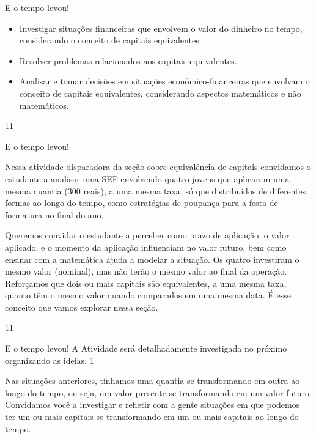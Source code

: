 \def\currentcolor{session1}
\begin{objectives}{E o tempo levou!}
{
\begin{itemize}
\item Investigar situações financeiras que envolvem o valor do dinheiro no tempo, considerando o conceito de capitais equivalentes 
\item Resolver problemas relacionados aos capitais equivalentes.
\item Analisar e tomar decisões em situações econômico-financeiras que envolvam o conceito de capitais equivalentes, considerando aspectos matemáticos e não matemáticos.
\end{itemize}
}{1}{1}
\end{objectives}
\begin{sugestions}{E o tempo levou!}
{
Nessa atividade disparadora da seção sobre equivalência de capitais convidamos o estudante a analisar uma SEF envolvendo quatro jovens que aplicaram uma mesma quantia (300 reais), a uma mesma taxa, só que distribuídos de diferentes formas ao longo do tempo, como estratégias de poupança para a festa de formatura no final do ano. 

Queremos convidar o estudante a perceber como prazo de aplicação, o valor aplicado, e o momento da aplicação influenciam no valor futuro, bem como ensinar com a matemática ajuda a modelar a situação. Os quatro investiram o mesmo valor (nominal), mas não terão o mesmo valor ao final da operação.
Reforçamos que dois ou mais capitais são equivalentes, a uma mesma taxa, quanto têm o mesmo valor quando comparados em uma mesma data. É esse conceito que vamos explorar nessa seção.

}{1}{1}
\end{sugestions}
\begin{answer}{E o tempo levou!}
{
A Atividade será detalhadamente investigada no próximo organizando as ideias.
}{1}
\end{answer}
\label{fin-exp-4}

Nas situações anteriores, tínhamos uma quantia se transformando em outra ao longo do tempo, ou seja, um valor presente se transformando em um valor futuro. Convidamos você a investigar e refletir com a gente situações em que podemos ter um ou mais capitais se transformando em um ou mais capitais ao longo do tempo.



